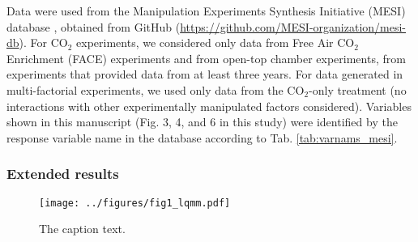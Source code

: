 \documentclass{myreport}
\begin{document}
Data were used from the Manipulation Experiments Synthesis Initiative (MESI) database \citep{vansundert_when_2023}, obtained from GitHub (\url{https://github.com/MESI-organization/mesi-db}). For CO$_2$ experiments, we considered only data from Free Air CO$_2$ Enrichment (FACE) experiments and from open-top chamber experiments, from experiments that provided data from at least three years. For data generated in multi-factorial experiments, we used only data from the CO$_2$-only treatment (no interactions with other experimentally manipulated factors considered). Variables shown in this manuscript (Fig. 3, 4, and 6 in this study) were identified by the response variable name in the database according to Tab. \ref{tab:varnams_mesi}.


\subsubsection{Extended results}

%
%


\begin{figure}[h]
\centering
\texttt{[image: ../figures/fig1\_lqmm.pdf]}
\caption{The caption text.}
\end{figure}

\clearpage

\end{document}

